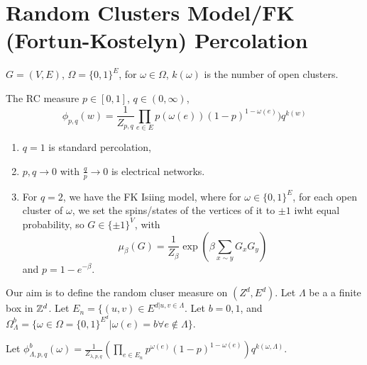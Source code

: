 
\section{Random Clusters Model/FK (Fortun-Kostelyn) Percolation}
\label{sec:rand-clust-modelfk}

\begin{defn}
  \label{defn:random_walks_on_graphs:30}
  $G = (V, E)$, $\Omega = \{ 0, 1 \}^{E}$, for $\omega \in \Omega$,
  $k(\omega)$ is the  number of open clusters.

  The RC measure $p \in [0, 1]$, $q \in (0, \infty)$,
  \begin{equation}
    \label{eq:49}
    \phi_{p, q}(w) = \frac{1}{Z_{p, q}} \prod_{e \in E} p(\omega(e)) (1-p)^{1 -
      \omega(e)})  q^{k(w)}
  \end{equation}
\end{defn}

\begin{enumerate}
\item $q = 1$ is standard percolation,
\item $p, q \rightarrow 0$ with $\frac{q}{p} \rightarrow 0$ is
  electrical networks.
\item For $q = 2$, we have the FK Isiing model, where for $\omega \in
  \{ 0, 1 \}^{E}$, for each open cluster of $\omega$, we set the
  spins/states of the vertices of it to $\pm 1$ iwht equal
  probability, so $G \in \{ \pm 1 \}^{V}$, with
  \begin{equation}
    \label{eq:50}
    \mu_{\beta}(G) = \frac{1}{Z_{\beta}} \exp(\beta \sum_{x \sim y}
    G_{x} G_{y})
  \end{equation} and $p = 1 - e^{-\beta}$.
\end{enumerate}

Our aim is to define the random cluser measure on $(Z^{d}, E^{d})$.
Let $\Lambda$ be a a finite box in $\mathbb{Z}^{d}$.  Let $E_{n} = \{ (u, v)
\in E^{d | u, v \in \Lambda}$.  Let $b = 0, 1$, and
$\Omega_{\Lambda}^{b} = \{ \omega \in \Omega = \{ 0, 1 \}^{E^{d}} |
\omega(e) = b \forall e \notin \Lambda \}$. 

Let $\phi_{\Lambda, p, q}^{b}(\omega) = \frac{1}{Z_{\lambda, p, q}}
(\prod_{e \in E_{n}} p^{\omega(e)} (1-p)^{1 - \omega(e)}) q^{k(\omega,
  \Lambda)}$.


